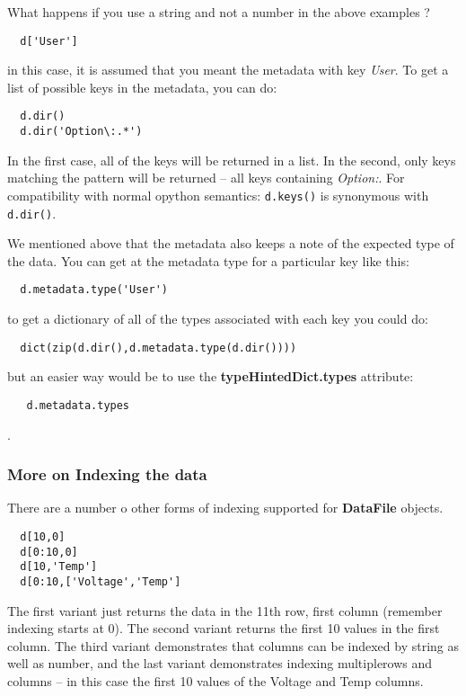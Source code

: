 \documentclass[a4paper,11pt]{scrartcl}
\begin{document}
What happens if you use a string and not a number in the above examples ?
\begin{lstlisting}
  d['User']
\end{lstlisting}
in this case, it is assumed that you meant the metadata with key \textit{User}.
To get a list of possible keys in the metadata, you can do:
\begin{lstlisting}
  d.dir()
  d.dir('Option\:.*')
\end{lstlisting}
In the first case, all of the keys will be returned in a list. In the second,
only keys matching the pattern will be returned -- all keys containing
\textit{Option:}. For compatibility with normal opython semantics: \verb#d.keys()# is
synonymous with \verb#d.dir()#.

We mentioned above that the metadata also keeps a note of the expected type of
the data. You can get at the metadata type for a particular key like this:
\begin{lstlisting}
  d.metadata.type('User')
\end{lstlisting}
to get a dictionary of all of the types associated with each key you could do:
\begin{lstlisting}
  dict(zip(d.dir(),d.metadata.type(d.dir())))
\end{lstlisting}
but an easier way would be to use the \textbf{typeHintedDict.types} attribute:
\begin{lstlisting}
   d.metadata.types
\end{lstlisting}
.

\subsubsection{More on Indexing the data}

There are a number o other forms of indexing supported for \textbf{DataFile}
objects.

\begin{lstlisting}
  d[10,0]
  d[0:10,0]
  d[10,'Temp']
  d[0:10,['Voltage','Temp']
\end{lstlisting}

The first variant just returns the data in the 11th row, first column (remember
indexing starts at 0). The second variant returns the first 10 values in the
first column. The third variant demonstrates that columns can be indexed by
string as well as number, and the last variant demonstrates indexing
multiplerows and columns -- in this case the first 10 values of the Voltage and
Temp columns.
\end{document}
